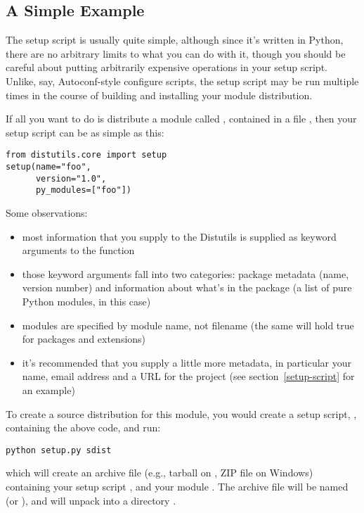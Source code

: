\documentclass{howto}
\begin{document}
\subsection{A Simple Example}
\label{simple-example}

The setup script is usually quite simple, although since it's written
in Python, there are no arbitrary limits to what you can do with it,
though you should be careful about putting arbitrarily expensive
operations in your setup script. Unlike, say, Autoconf-style configure
scripts, the setup script may be run multiple times in the course of
building and installing your module distribution.  

If all you want to do is distribute a module called ,
contained in a file , then your setup script can be as
simple as this:

\begin{verbatim}
from distutils.core import setup
setup(name="foo",
      version="1.0",
      py_modules=["foo"])
\end{verbatim}

Some observations:
\begin{itemize}
\item most information that you supply to the Distutils is supplied as
  keyword arguments to the  function
\item those keyword arguments fall into two categories: package
  metadata (name, version number) and information about what's in the
  package (a list of pure Python modules, in this case)
\item modules are specified by module name, not filename (the same will
  hold true for packages and extensions)
\item it's recommended that you supply a little more metadata, in
  particular your name, email address and a URL for the project
  (see section~\ref{setup-script} for an example)
\end{itemize}

To create a source distribution for this module, you would create a
setup script, , containing the above code, and run:

\begin{verbatim}
python setup.py sdist
\end{verbatim}

which will create an archive file (e.g., tarball on \UNIX, ZIP file on
Windows) containing your setup script , and your module
.  The archive file will be named  (or
), and will unpack into a directory .
\end{document}
